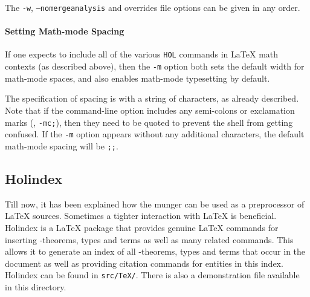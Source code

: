 \smallskip \noindent The \texttt{-w}, \texttt{--nomergeanalysis} and
overrides file options can be given in any order.

\paragraph{Setting Math-mode Spacing} If one expects to include all of the various \texttt{\bs{}HOL} commands in \LaTeX{} math contexts (as described above), then the \texttt{-m} option both sets the default width for math-mode spaces, and also
enables math-mode typesetting by default.

The specification of spacing is with a string of characters, as already described.
Note that if the command-line option includes any semi-colons or exclamation marks (\eg, \texttt{-mc;}), then they need to be quoted to prevent the shell from getting confused.
If the \texttt{-m} option appears without any additional characters, the default math-mode spacing will be \texttt{\bs;\bs;}.


\subsection{Holindex}

Till now, it has been explained how the munger can be used as a preprocessor of \LaTeX{} sources.
Sometimes a tighter interaction with \LaTeX{} is beneficial.
Holindex is a \LaTeX{} package that provides genuine \LaTeX{} commands for inserting \HOL{}-theorems, types and terms as well as many related commands.
This allows it to generate an index of all \HOL{}-theorems, types and terms that occur in the document as well as providing citation commands for \HOL{} entities in this index.
Holindex can be found in \texttt{src/TeX/}.
There is also a demonstration file available in this directory.


